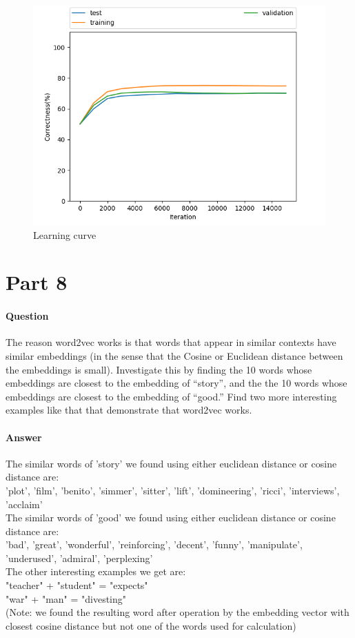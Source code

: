 \documentclass[11pt,twoside]{article}
\begin{document}
\begin{figure}[h]
	\centering
	\includegraphics[scale=0.8]{part7.png}
	\caption*{Learning curve}
\end{figure}

\clearpage

\section*{Part 8}
\paragraph{Question}
The reason word2vec works is that words that appear in similar contexts have similar embeddings (in the sense that the Cosine or Euclidean distance between the embeddings is small). Investigate this by finding the 10 words whose embeddings are closest to the embedding of “story”, and the the 10 words whose embeddings are closest to the embedding of “good.” Find two more interesting examples like that that demonstrate that word2vec works.

\paragraph{Answer}
The similar words of 'story' we found using either euclidean distance or cosine distance are:\\
'plot', 'film', 'benito', 'simmer', 'sitter', 'lift', 'domineering', 'ricci', 'interviews', 'acclaim'\\
The similar words of 'good' we found using either euclidean distance or cosine distance are:\\
'bad', 'great', 'wonderful', 'reinforcing', 'decent', 'funny', 'manipulate', 'underused', 'admiral', 'perplexing'\\
The other interesting examples we get are:\\
"teacher" + "student" = "expects"\\
"war" + "man" = "divesting"\\
(Note: we found the resulting word after operation by the embedding vector with closest cosine distance but not one of the words used for calculation)
\clearpage
\end{document}
